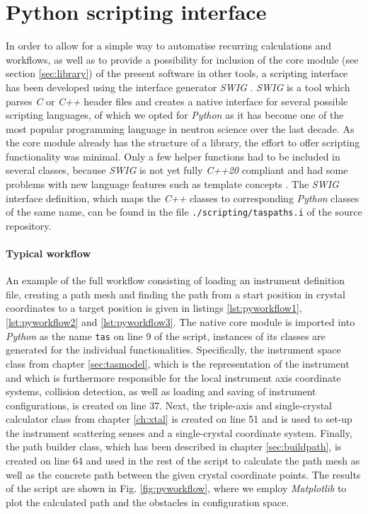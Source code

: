 \section{Python scripting interface}
\label{sec:scripting}

In order to allow for a simple way to automatise recurring calculations and workflows, as well as to provide
a possibility for inclusion of the core module (see section \ref{sec:library}) of the present 
software in other tools, a scripting interface has been developed using the interface generator \textit{SWIG} \cite{web_swig}. 
\textit{SWIG} is a tool which parses \textit{C} or \textit{C++} header files and creates a native interface 
for several possible scripting languages, of which we opted for \textit{Python} \cite{Rossum2011, web_python} 
as it has become one of the most popular programming language in neutron science over the last decade.
As the core module already has the structure of a library, the effort to offer scripting functionality
was minimal. Only a few helper functions had to be included in several classes, because \textit{SWIG}
is not yet fully \textit{C++20} compliant and had some problems with new language features such as 
template concepts \cite{cppwiki_concepts}.
The \textit{SWIG} interface definition, which maps the \textit{C++} classes to corresponding \textit{Python} 
classes of the same name, can be found in the file \lstinline|./scripting/taspaths.i| of the source repository.

\paragraph{Typical workflow}
An example of the full workflow consisting of loading an instrument definition file, creating a path 
mesh and finding the path from a start position in crystal coordinates to a target position is given in listings 
\ref{lst:pyworkflow1}, \ref{lst:pyworkflow2} and \ref{lst:pyworkflow3}.
The native core module is imported into \textit{Python} as the name \lstinline[language=C++]|tas| on line 9 of the script,
instances of its classes are generated for the individual functionalities.
Specifically, the instrument space class from chapter \ref{sec:tasmodel}, which is the representation of the instrument 
and which is furthermore responsible for the local instrument axis coordinate systems, collision detection, as well as 
loading and saving of instrument configurations, is created on line 37. 
Next, the triple-axis and single-crystal calculator class from chapter \ref{ch:xtal} is created on line 51 and is 
used to set-up the instrument scattering senses and a single-crystal coordinate system.
Finally, the path builder class, which has been described in chapter \ref{sec:buildpath}, is created on line 64 
and used in the rest of the script to calculate the path mesh as well as the concrete path between the 
given crystal coordinate points.
The results of the script are shown in Fig. \ref{fig:pyworkflow}, where we employ \textit{Matplotlib} 
\cite{Hunter2007, web_matplotlib} to plot the calculated path and the obstacles in configuration space.

